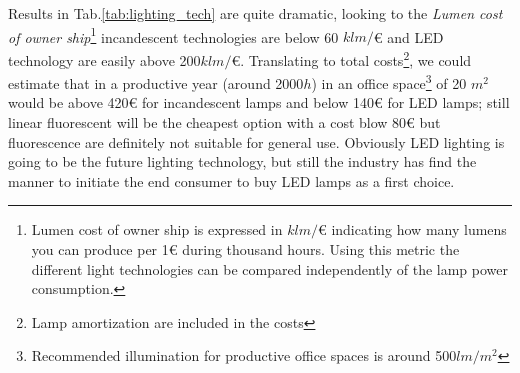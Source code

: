 Results in Tab.\ref{tab:lighting_tech} are quite dramatic, looking to the \emph{Lumen cost of owner ship}\footnote{Lumen cost of owner ship is expressed in $klm/$€ indicating how many lumens you can produce per 1€ during thousand hours. Using this metric the different light technologies can be compared independently of the lamp power consumption.} incandescent technologies are below 60 $klm/$€   and LED technology are easily above 200$klm/$€. Translating to total costs\footnote{Lamp amortization are included in the costs}, we could estimate that in a productive year (around 2000$h$) in an office space\footnote{Recommended illumination for productive office spaces is around 500$ lm/m^2 $ } of 20 $ m^2 $ would be above 420€ for incandescent lamps and below 140€ for LED lamps; still linear fluorescent will be the cheapest option with a cost blow 80€ but fluorescence are definitely not suitable for general use. Obviously LED lighting is going to be the future lighting technology, but still the industry has find the manner to initiate the end consumer to buy LED lamps as a first choice.


